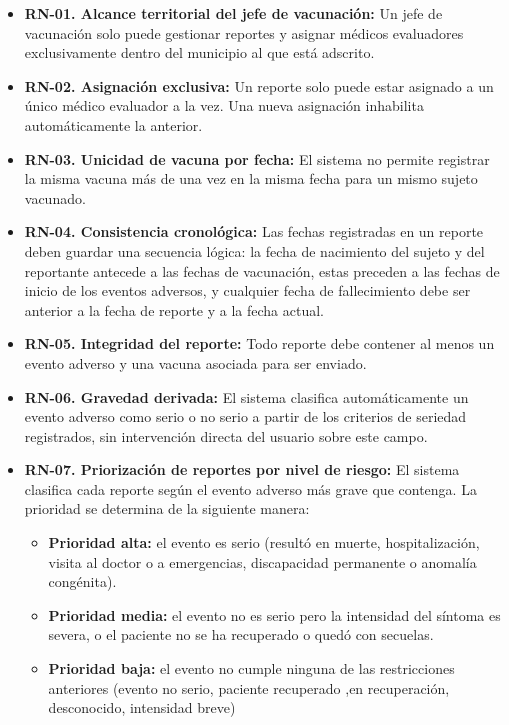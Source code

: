\begin{itemize}

    \item \textbf{RN-01. Alcance territorial del jefe de vacunación:} Un jefe de vacunación solo puede gestionar reportes y asignar médicos evaluadores exclusivamente dentro del municipio al que está adscrito.

    \item \textbf{RN-02. Asignación exclusiva:} Un reporte solo puede estar asignado a un único médico evaluador a la vez. Una nueva asignación inhabilita automáticamente la anterior.
    
    \item \textbf{RN-03. Unicidad de vacuna por fecha:} El sistema no permite registrar la misma vacuna más de una vez en la misma fecha para un mismo sujeto vacunado.
    
    \item \textbf{RN-04. Consistencia cronológica:} Las fechas registradas en un reporte deben guardar una secuencia lógica: la fecha de nacimiento del sujeto y del reportante antecede a las fechas de vacunación, estas preceden a las fechas de inicio de los eventos adversos, y cualquier fecha de fallecimiento debe ser anterior a la fecha de reporte y a la fecha actual.
    
    \item \textbf{RN-05. Integridad del reporte:} Todo reporte debe contener al menos un evento adverso y una vacuna asociada para ser enviado.
    
    \item \textbf{RN-06. Gravedad derivada:} El sistema clasifica automáticamente un evento adverso como serio o no serio a partir de los criterios de seriedad registrados, sin intervención directa del usuario sobre este campo.
    
    \item \textbf{RN-07. Priorización de reportes por nivel de riesgo:} El sistema clasifica cada reporte según el evento adverso más grave que contenga. La prioridad se determina de la siguiente manera:
    \begin{itemize}
        \item \textbf{Prioridad alta:} el evento es serio (resultó en muerte, hospitalización, visita al doctor o a emergencias, discapacidad permanente o anomalía congénita).
        \item \textbf{Prioridad media:} el evento no es serio pero la intensidad del síntoma es severa, o el paciente no se ha recuperado o quedó con secuelas.
        \item \textbf{Prioridad baja:} el evento no cumple ninguna de las restricciones anteriores (evento no serio, paciente recuperado ,en recuperación, desconocido, intensidad breve)
    \end{itemize}


\end{itemize}
